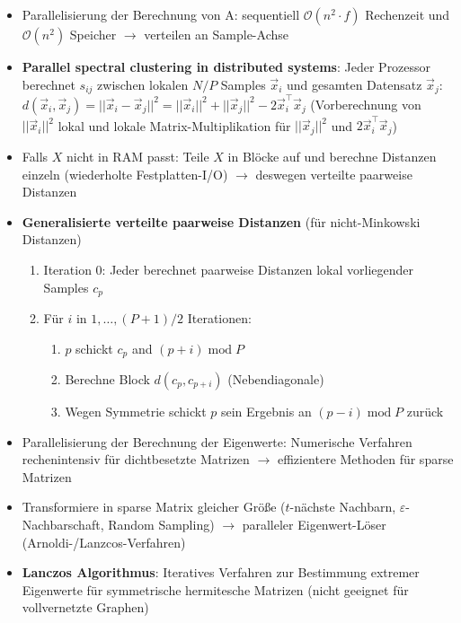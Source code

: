 \documentclass[11pt]{scrartcl}
\begin{document}
\begin{itemize}
    \item Parallelisierung der Berechnung von A: sequentiell $\mathcal{O}(n^2 \cdot f)$
    Rechenzeit und $\mathcal{O}(n^2)$ Speicher $\rightarrow$ verteilen an Sample-Achse
    \item \textbf{Parallel spectral clustering in distributed systems}: Jeder
    Prozessor berechnet $s_{ij}$ zwischen lokalen $N/P$ Samples $\vec{x}_i$ und gesamten Datensatz
    $\vec{x}_j$: $d(\vec{x}_i, \vec{x}_j) = || \vec{x}_i - \vec{x}_j ||^2 = ||\vec{x}_i||^2 + 
    ||\vec{x}_j||^2 - 2 \vec{x}_i^\top \vec{x}_j$ (Vorberechnung von $||\vec{x}_i||^2$ lokal
    und lokale Matrix-Multiplikation für $||\vec{x}_j||^2$ und $2 \vec{x}_i^\top \vec{x}_j$)
    \item Falls $X$ nicht in RAM passt: Teile $X$ in Blöcke auf und berechne Distanzen einzeln 
    (wiederholte Festplatten-I/O) $\rightarrow$ deswegen verteilte paarweise Distanzen
    \item \textbf{Generalisierte verteilte paarweise Distanzen} (für nicht-Minkowski Distanzen)
    \begin{enumerate}
        \item Iteration 0: Jeder berechnet paarweise Distanzen lokal vorliegender Samples $c_p$
        \item Für $i$ in $1, \dots, (P + 1)/2$ Iterationen:
        \begin{enumerate}
            \item $p$ schickt $c_p$ and $(p + i) \; \mathrm{mod} \; P$
            \item Berechne Block $d(c_p, c_{p+i})$ (Nebendiagonale)
            \item Wegen Symmetrie schickt $p$ sein Ergebnis an $(p - i) \; \mathrm{mod} \; P$ 
            zurück
        \end{enumerate}
    \end{enumerate}
    \item Parallelisierung der Berechnung der Eigenwerte: Numerische Verfahren rechenintensiv
    für dichtbesetzte Matrizen $\rightarrow$ effizientere Methoden für sparse Matrizen
    \item Transformiere in sparse Matrix gleicher Größe ($t$-nächste Nachbarn, 
    $\varepsilon$-Nachbarschaft, Random Sampling) $\rightarrow$ paralleler Eigenwert-Löser 
    (Arnoldi-/Lanzcos-Verfahren)
    \item \textbf{Lanczos Algorithmus}: Iteratives Verfahren zur Bestimmung extremer Eigenwerte für 
    symmetrische hermitesche Matrizen (nicht geeignet für vollvernetzte Graphen)

\end{itemize}
\end{document}
